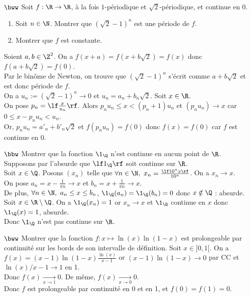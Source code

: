 \documentclass[11pt]{article}
\begin{document}
\begin{exercice}{$\bww$}{}
    Soit $f:\R\to\R$, à la fois $1$-périodique et $\sqrt{2}$-périodique, et continue en 0.
    \begin{enumerate}
        \item Soit $n\in\N$. Montrer que $(\sqrt{2}-1)^n$ est une période de $f$.
        \item Montrer que $f$ est constante.
    \end{enumerate}
    \tcblower
     Soient $a,b\in\Z^2$. On a $f(x+a)=f(x+b\sqrt{2})=f(x)$ donc $f(a+b\sqrt{2})=f(0)$.\\
    Par le binôme de Newton, on trouve que $(\sqrt{2}-1)^n$ s'écrit comme $a+b\sqrt{2}$ et est donc période de $f$.\\
     On a $u_n:=(\sqrt{2}-1)^n\to0$ et $u_n=a_n+b_n\sqrt{2}$. Soit $x\in\R$.\\
    On pose $p_n=\lf\frac{x}{u_n}\rf$. Alors $p_nu_n\leq x <(p_n+1)u_n$ et $(p_nu_n)\to x$ car $0\leq x - p_nu_n<u_n$.\\
    Or, $p_nu_n=a'_n+b'_n\sqrt{2}$ et $f(p_nu_n)=f(0)$ donc $f(x)=f(0)$ car $f$ est continue en 0.
\end{exercice}

\pagebreak

\begin{exercice}{$\bbw$}{}
    Montrer que la fonction $\1_\Q$ n'est continue en aucun point de $\R$.
    \tcblower
    Supposons par l'absurde que $\lf1_\Q\rf$ soit continue sur $\R$.\\
    Soit $x\in\Q$. Posons $(x_n)$ telle que $\forall n \in \N, ~ x_n = \frac{\lf 10^nx\rf}{10^n}$. On a $x_n\to x$.\\
    On pose $a_n=x-\frac{1}{\pi n}\to x$ et $b_n=x+\frac{1}{\pi n}\to x$.\\
    De plus, $\forall n \in \N, ~ a_n \leq x \leq b_n$, $\1_\Q(a_n)=\1_\Q(b_n)=0$ donc $x\notin\Q$ : absurde.\n
    Soit $x\in\R\setminus\Q$. On a $\1_\Q(x_n)=1$ or $x_n\to x$ et $\1_\Q$ continue en $x$ donc $\1_\Q(x)=1$, absurde.\\
    Donc $\1_\Q$ n'est pas continue sur $\R$.
\end{exercice}

\begin{exercice}{$\bww$}{}
    Montrer que la fonction $f:x\mapsto\ln(x)\ln(1-x)$ est prolongeable par continuité sur les bords de son intervalle de définition.
    \tcblower
    Soit $x\in]0,1[$. On a $f(x)=(x-1)\ln(1-x)\frac{\ln(x)}{x-1}$ or $(x-1)\ln(1-x)\to0$ par CC et $\ln(x)/x-1\to1$ en 1.\\
    Donc $f(x)\xrightarrow[x\to1]{}0$. De même, $f(x)\xrightarrow[x\to0]{}0$.\\
    Donc $f$ est prolongeable par continuité en 0 et en 1, et $f(0)=f(1)=0$.
\end{exercice}
\end{document}
